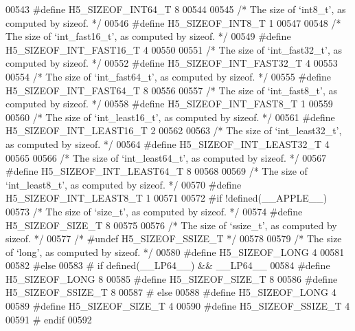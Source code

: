 \begin{DoxyCode}
{00543 \textcolor{preprocessor}{#define H5\_SIZEOF\_INT64\_T 8}
00544 
00545 \textcolor{comment}{/* The size of `int8\_t', as computed by sizeof. */}
00546 \textcolor{preprocessor}{#define H5\_SIZEOF\_INT8\_T 1}
00547 
00548 \textcolor{comment}{/* The size of `int\_fast16\_t', as computed by sizeof. */}
00549 \textcolor{preprocessor}{#define H5\_SIZEOF\_INT\_FAST16\_T 4}
00550 
00551 \textcolor{comment}{/* The size of `int\_fast32\_t', as computed by sizeof. */}
00552 \textcolor{preprocessor}{#define H5\_SIZEOF\_INT\_FAST32\_T 4}
00553 
00554 \textcolor{comment}{/* The size of `int\_fast64\_t', as computed by sizeof. */}
00555 \textcolor{preprocessor}{#define H5\_SIZEOF\_INT\_FAST64\_T 8}
00556 
00557 \textcolor{comment}{/* The size of `int\_fast8\_t', as computed by sizeof. */}
00558 \textcolor{preprocessor}{#define H5\_SIZEOF\_INT\_FAST8\_T 1}
00559 
00560 \textcolor{comment}{/* The size of `int\_least16\_t', as computed by sizeof. */}
00561 \textcolor{preprocessor}{#define H5\_SIZEOF\_INT\_LEAST16\_T 2}
00562 
00563 \textcolor{comment}{/* The size of `int\_least32\_t', as computed by sizeof. */}
00564 \textcolor{preprocessor}{#define H5\_SIZEOF\_INT\_LEAST32\_T 4}
00565 
00566 \textcolor{comment}{/* The size of `int\_least64\_t', as computed by sizeof. */}
00567 \textcolor{preprocessor}{#define H5\_SIZEOF\_INT\_LEAST64\_T 8}
00568 
00569 \textcolor{comment}{/* The size of `int\_least8\_t', as computed by sizeof. */}
00570 \textcolor{preprocessor}{#define H5\_SIZEOF\_INT\_LEAST8\_T 1}
00571 
00572 \textcolor{preprocessor}{#if !defined(\_\_APPLE\_\_)}
00573 \textcolor{comment}{/* The size of `size\_t', as computed by sizeof. */}
00574 \textcolor{preprocessor}{#define H5\_SIZEOF\_SIZE\_T 8}
00575 
00576 \textcolor{comment}{/* The size of `ssize\_t', as computed by sizeof. */}
00577 \textcolor{comment}{/* #undef H5\_SIZEOF\_SSIZE\_T */}
00578 
00579 \textcolor{comment}{/* The size of `long', as computed by sizeof. */}
00580 \textcolor{preprocessor}{#define H5\_SIZEOF\_LONG 4}
00581 
00582 \textcolor{preprocessor}{#else}
00583 \textcolor{preprocessor}{   # if defined(\_\_LP64\_\_) && \_\_LP64\_\_}
00584 \textcolor{preprocessor}{  #define H5\_SIZEOF\_LONG 8}
00585 \textcolor{preprocessor}{  #define H5\_SIZEOF\_SIZE\_T 8}
00586 \textcolor{preprocessor}{  #define H5\_SIZEOF\_SSIZE\_T 8}
00587 \textcolor{preprocessor}{  # else}
00588 \textcolor{preprocessor}{  #define H5\_SIZEOF\_LONG 4}
00589 \textcolor{preprocessor}{  #define H5\_SIZEOF\_SIZE\_T 4}
00590 \textcolor{preprocessor}{  #define H5\_SIZEOF\_SSIZE\_T 4}
00591 \textcolor{preprocessor}{  # endif}
00592 
}
\end{DoxyCode}
